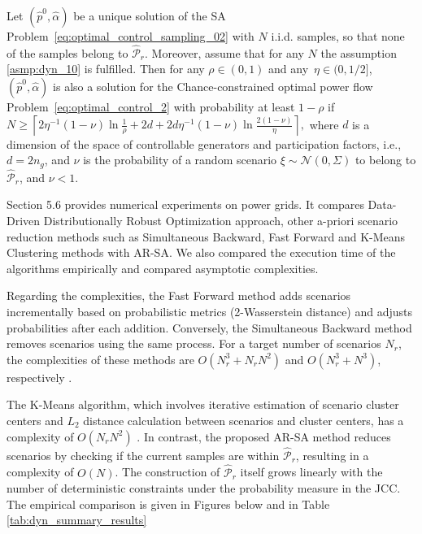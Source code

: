\begin{theorem}\label{thm:dyn_40}
Let $(\hat{p}^0, \hat{\alpha})$ be a unique solution of the SA Problem~\eqref{eq:optimal_control_sampling_02} with $N$ i.i.d. samples, so that none of the samples belong to $\hat{\mathcal{P}}_{r}$. Moreover, assume that for any $N$ the assumption \ref{asmp:dyn_10} is fulfilled. Then for any $\rho \in (0,1)$ and any~$\eta \in (0, 1/2]$, $(\hat{p}^0, \hat{\alpha})$ is also a solution for the Chance-constrained optimal power flow Problem~\eqref{eq:optimal_control_2} with probability at least $1-\rho$ if 
$%
  N \ge \left\lceil 2\eta^{-1}(1-\nu)\ln \frac{1}{\rho} + 2d + 2d\eta^{-1}(1-\nu) \ln\frac{2(1-\nu)}{\eta} \right\rceil, 
$%
 where $d$ is a dimension of the space of controllable generators and participation factors, i.e., $d = 2 n_g$, and $\nu$ is the probability of a random scenario $\xi \sim \mathcal{N}(0, \Sigma)$ to belong to $\hat{\mathcal{P}}_{r}$, and $\nu < 1$. 
\end{theorem}

Section 5.6 provides numerical experiments on power grids. It compares Data-Driven Distributionally Robust Optimization approach, other a-priori scenario reduction methods such as Simultaneous Backward, Fast Forward and K-Means Clustering methods with AR-SA. 
We also compared the execution time of the algorithms empirically and compared asymptotic complexities.

Regarding the complexities, the Fast Forward method adds scenarios incrementally based on probabilistic metrics (2-Wasserstein distance) and adjusts probabilities after each addition. Conversely, the Simultaneous Backward method removes scenarios using the same process. For a target number of scenarios $N_r$, the complexities of these methods are $O(N_r^3 + N_r N^2)$ and $O(N_r^3 + N^3)$, respectively \cite{heitsch2003scenario, rujeerapaiboon2022scenario}.

The K-Means algorithm, which involves iterative estimation of scenario cluster centers and $L_2$ distance calculation between scenarios and cluster centers, has a complexity of $O(N_rN^2)$ \cite{pakhira2014linear}. In contrast, the proposed AR-SA method reduces scenarios by checking if the current samples are within $\hat{\mathcal{P}}_r$, resulting in a complexity of $O(N)$. The construction of $\hat{\mathcal{P}}_r$ itself grows linearly with the number of deterministic constraints under the probability measure in the JCC.
The empirical comparison is given in Figures below and in Table \ref{tab:dyn_summary_results}

